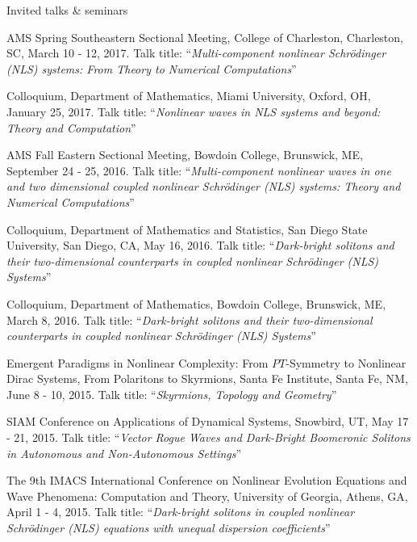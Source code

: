 \documentclass[10pt]{article} %
\newenvironment{innerlist}[1][\enskip\textbullet]%
        {\begin{compactitem}[#1]}{\end{compactitem}}
\begin{document}
\begin{section}{Invited talks \& seminars}
\begin{innerlist}
\item   AMS Spring Southeastern Sectional Meeting, College of Charleston, Charleston, SC, March 10 - 12, 2017.
        Talk title: ``\textit{Multi-component nonlinear Schr\"odinger (NLS) systems: From Theory to Numerical Computations}''   

\item   Colloquium, Department of Mathematics, Miami University, Oxford, OH, January 25, 2017.
        Talk title: ``\textit{Nonlinear waves in NLS systems and beyond: Theory and Computation}''

\item   AMS Fall Eastern Sectional Meeting, Bowdoin College, Brunswick, ME, September 24 - 25, 2016.
        Talk title: ``\textit{Multi-component nonlinear waves in one and two dimensional coupled nonlinear
        Schr\"odinger (NLS) systems: Theory and Numerical Computations}''
    
\item   Colloquium, Department of Mathematics and Statistics, San Diego State University, San Diego, CA, May 16, 2016.
        Talk title: ``\textit{Dark-bright solitons and their two-dimensional counterparts in coupled nonlinear Schr\"odinger (NLS) Systems}''

\item   Colloquium, Department of Mathematics, Bowdoin College, Brunswick, ME, March 8, 2016.
        Talk title: ``\textit{Dark-bright solitons and their two-dimensional counterparts in coupled nonlinear Schr\"odinger (NLS) Systems}''
    
\item   Emergent Paradigms in Nonlinear Complexity: From $PT$-Symmetry to Nonlinear Dirac Systems, From Polaritons to Skyrmions, %
        Santa Fe Institute, Santa Fe, NM, June 8 - 10, 2015. Talk title: ``\textit{Skyrmions, Topology and Geometry}''

\item   SIAM Conference on Applications of Dynamical Systems, Snowbird, UT, May 17 - 21, 2015. Talk title: %
        ``\textit{Vector Rogue Waves and Dark-Bright Boomeronic Solitons in Autonomous and Non-Autonomous Settings}''

\item   The 9th IMACS International Conference on Nonlinear Evolution Equations and Wave Phenomena: Computation and Theory, %
        University of Georgia, Athens, GA, April 1 - 4, 2015. Talk title: %
        ``\textit{Dark-bright solitons in coupled nonlinear Schr\"odinger (NLS) equations with unequal dispersion coefficients}''      
   

\end{innerlist}
\end{section}
\end{document}
